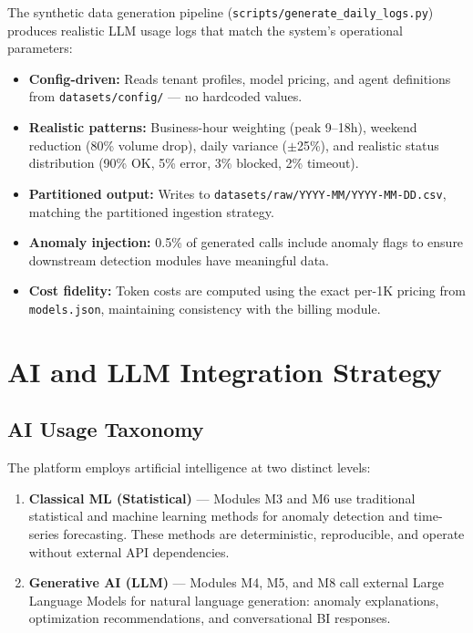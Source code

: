 \documentclass[12pt,a4paper,twoside]{report}
\begin{document}
The synthetic data generation pipeline (\texttt{scripts/generate\_daily\_logs.py}) produces realistic LLM usage logs that match the system's operational parameters:

\begin{itemize}
  \item \textbf{Config-driven:} Reads tenant profiles, model pricing, and agent definitions from \texttt{datasets/config/} --- no hardcoded values.
  \item \textbf{Realistic patterns:} Business-hour weighting (peak 9--18h), weekend reduction (80\% volume drop), daily variance ($\pm$25\%), and realistic status distribution (90\% OK, 5\% error, 3\% blocked, 2\% timeout).
  \item \textbf{Partitioned output:} Writes to \texttt{datasets/raw/YYYY-MM/YYYY-MM-DD.csv}, matching the partitioned ingestion strategy.
  \item \textbf{Anomaly injection:} 0.5\% of generated calls include anomaly flags to ensure downstream detection modules have meaningful data.
  \item \textbf{Cost fidelity:} Token costs are computed using the exact per-1K pricing from \texttt{models.json}, maintaining consistency with the billing module.
\end{itemize}


\chapter{AI and LLM Integration Strategy}

\section{AI Usage Taxonomy}

The platform employs artificial intelligence at two distinct levels:

\begin{enumerate}
  \item \textbf{Classical ML (Statistical)} — Modules M3 and M6 use traditional statistical and machine learning methods for anomaly detection and time-series forecasting. These methods are deterministic, reproducible, and operate without external API dependencies.

  \item \textbf{Generative AI (LLM)} — Modules M4, M5, and M8 call external Large Language Models for natural language generation: anomaly explanations, optimization recommendations, and conversational BI responses.
\end{enumerate}
\end{document}
